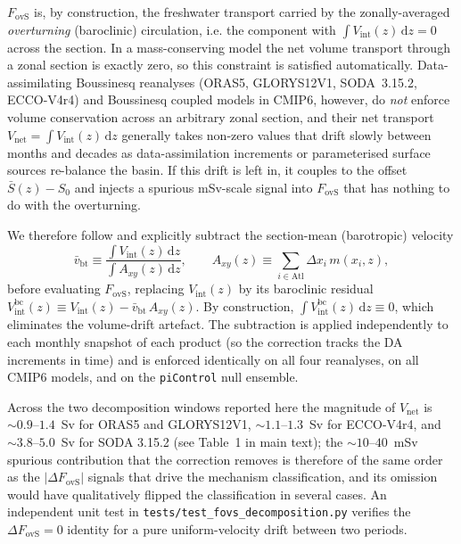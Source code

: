 \documentclass[11pt,a4paper]{article}
\newcommand{\Fovs}{F_\mathrm{ovS}}
\begin{document}
$\Fovs$ is, by construction, the freshwater transport carried by the zonally-averaged \emph{overturning} (baroclinic) circulation, i.e. the component with $\int V_\mathrm{int}(z)\,\mathrm{d}z = 0$ across the section. In a mass-conserving model the net volume transport through a zonal section is exactly zero, so this constraint is satisfied automatically. Data-assimilating Boussinesq reanalyses (ORAS5, GLORYS12V1, SODA~3.15.2, ECCO-V4r4) and Boussinesq coupled models in CMIP6, however, do \emph{not} enforce volume conservation across an arbitrary zonal section, and their net transport $V_\mathrm{net} = \int V_\mathrm{int}(z)\,\mathrm{d}z$ generally takes non-zero values that drift slowly between months and decades as data-assimilation increments or parameterised surface sources re-balance the basin. If this drift is left in, it couples to the offset $\bar{S}(z) - S_0$ and injects a spurious mSv-scale signal into $\Fovs$ that has nothing to do with the overturning.

We therefore follow \citet{deVriesWeber2005, Mecking2017, Weijer2019} and explicitly subtract the section-mean (barotropic) velocity
\begin{equation}
\bar{v}_\mathrm{bt} \equiv
   \frac{\int V_\mathrm{int}(z)\,\mathrm{d}z}
        {\int A_{xy}(z)\,\mathrm{d}z},
  \qquad
A_{xy}(z) \equiv \sum_{i\in\mathrm{Atl}} \Delta x_i\,m(x_i, z),
\end{equation}
before evaluating $\Fovs$, replacing $V_\mathrm{int}(z)$ by its baroclinic residual $V_\mathrm{int}^{\mathrm{bc}}(z) \equiv V_\mathrm{int}(z) - \bar{v}_\mathrm{bt}\,A_{xy}(z)$. By construction, $\int V_\mathrm{int}^{\mathrm{bc}}(z)\,\mathrm{d}z \equiv 0$, which eliminates the volume-drift artefact. The subtraction is applied independently to each monthly snapshot of each product (so the correction tracks the DA increments in time) and is enforced identically on all four reanalyses, on all CMIP6 models, and on the \texttt{piControl} null ensemble.

Across the two decomposition windows reported here the magnitude of $V_\mathrm{net}$ is $\sim0.9$--$1.4$~Sv for ORAS5 and GLORYS12V1, $\sim1.1$--$1.3$~Sv for ECCO-V4r4, and $\sim3.8$--$5.0$~Sv for SODA 3.15.2 (see Table~1 in main text); the $\sim10$--$40$~mSv spurious contribution that the correction removes is therefore of the same order as the $|\Delta\Fovs|$ signals that drive the mechanism classification, and its omission would have qualitatively flipped the classification in several cases. An independent unit test in \texttt{tests/test\_fovs\_decomposition.py} verifies the $\Delta\Fovs = 0$ identity for a pure uniform-velocity drift between two periods.
\end{document}
